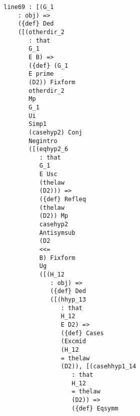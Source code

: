 \documentclass[12pt]{article}
\begin{document}
\begin{verbatim}
                                 line69 : [(G_1 
                                     : obj) => 
                                     ({def} Ded 
                                     ([(otherdir_2 
                                        : that 
                                        G_1 
                                        E B) => 
                                        ({def} (G_1 
                                        E prime 
                                        (D2)) Fixform 
                                        otherdir_2 
                                        Mp 
                                        G_1 
                                        Ui 
                                        Simp1 
                                        (casehyp2) Conj 
                                        Negintro 
                                        ([(eqhyp2_6 
                                           : that 
                                           G_1 
                                           E Usc 
                                           (thelaw 
                                           (D2))) => 
                                           ({def} Refleq 
                                           (thelaw 
                                           (D2)) Mp 
                                           casehyp2 
                                           Antisymsub 
                                           (D2 
                                           <<= 
                                           B) Fixform 
                                           Ug 
                                           ([(H_12 
                                              : obj) => 
                                              ({def} Ded 
                                              ([(hhyp_13 
                                                 : that 
                                                 H_12 
                                                 E D2) => 
                                                 ({def} Cases 
                                                 (Excmid 
                                                 (H_12 
                                                 = thelaw 
                                                 (D2)), [(casehhyp1_14 
                                                    : that 
                                                    H_12 
                                                    = thelaw 
                                                    (D2)) => 
                                                    ({def} Eqsymm 

\end{verbatim}
\end{document}
